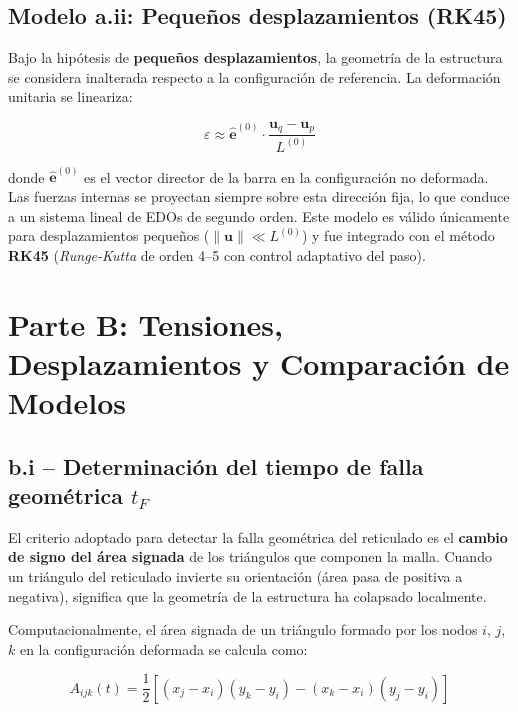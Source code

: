 \documentclass[12pt]{article}
\begin{document}
\subsection{Modelo a.ii: Pequeños desplazamientos (RK45)}

Bajo la hipótesis de \textbf{pequeños desplazamientos}, la geometría de la estructura se considera inalterada respecto a la configuración de referencia. La deformación unitaria se lineariza:

\begin{equation}
    \varepsilon \approx \hat{\mathbf{e}}^{(0)} \cdot \frac{\mathbf{u}_q - \mathbf{u}_p}{L^{(0)}}
    \label{eq:eps_pequenia}
\end{equation}

donde $\hat{\mathbf{e}}^{(0)}$ es el vector director de la barra en la configuración no deformada. Las fuerzas internas se proyectan siempre sobre esta dirección fija, lo que conduce a un sistema lineal de EDOs de segundo orden. Este modelo es válido únicamente para desplazamientos pequeños ($\|\mathbf{u}\| \ll L^{(0)}$) y fue integrado con el método \textbf{RK45} (\textit{Runge-Kutta} de orden 4--5 con control adaptativo del paso).

\section{Parte B: Tensiones, Desplazamientos y Comparación de Modelos}

\subsection{b.i -- Determinación del tiempo de falla geométrica $t_F$}

El criterio adoptado para detectar la falla geométrica del reticulado es el \textbf{cambio de signo del área signada} de los triángulos que componen la malla. Cuando un triángulo del reticulado invierte su orientación (área pasa de positiva a negativa), significa que la geometría de la estructura ha colapsado localmente.

Computacionalmente, el área signada de un triángulo formado por los nodos $i$, $j$, $k$ en la configuración deformada se calcula como:

\begin{equation}
    A_{ijk}(t) = \frac{1}{2} \left[ (x_j - x_i)(y_k - y_i) - (x_k - x_i)(y_j - y_i) \right]
    \label{eq:area_signada}
\end{equation}
\end{document}

